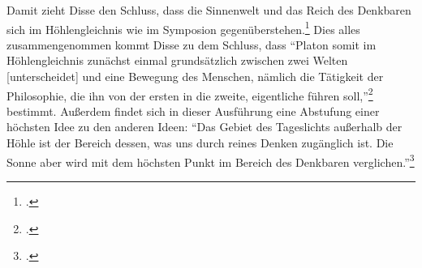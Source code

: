Damit zieht Disse den Schluss, dass die Sinnenwelt und das Reich des Denkbaren sich im Höhlengleichnis wie im Symposion gegenüberstehen.\footcite[vgl.][S. 28]{DisseMetaphysik}
Dies alles zusammengenommen kommt Disse zu dem Schluss, dass \enquote{Platon somit im Höhlengleichnis zunächst einmal grundsätzlich zwischen zwei Welten [unterscheidet] und eine Bewegung des Menschen, nämlich die Tätigkeit der Philosophie, die ihn von der ersten in die zweite, eigentliche führen soll,}\footcite[vgl.][S. 23f.]{DisseMetaphysik} bestimmt.
Außerdem findet sich in dieser Ausführung eine Abstufung einer höchsten Idee zu den anderen Ideen: 
\enquote{Das Gebiet des Tageslichts außerhalb der Höhle ist der Bereich dessen, was uns durch reines Denken zugänglich ist. Die Sonne aber wird mit dem höchsten Punkt im Bereich des Denkbaren verglichen.}\footcite[][S. 49]{DisseMetaphysik} 

